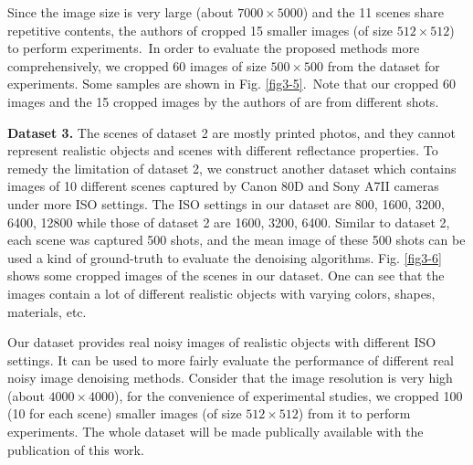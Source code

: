 Since the image size is very large (about $7000\times5000$) and the 11 scenes share repetitive contents, the authors of \cite{crosschannel2016} cropped 15 smaller images (of size $512\times512$) to perform experiments.\ In order to evaluate the proposed methods more comprehensively, we cropped 60 images of size $500\times500$ from the dataset for experiments. Some samples are shown in Fig. \ref{fig3-5}.\ Note that our cropped 60 images and the 15 cropped images by the authors of \cite{crosschannel2016} are from different shots.


\textbf{Dataset 3.} The scenes of dataset 2 are mostly printed photos, and they cannot represent realistic objects and scenes with different reflectance properties. To remedy the limitation of dataset 2, we construct another dataset which contains images of 10 different scenes captured by Canon 80D and Sony A7II cameras under more ISO settings. The ISO settings in our dataset are 800, 1600, 3200, 6400, 12800 while those of dataset 2 are 1600, 3200, 6400. Similar to dataset 2, each scene was captured 500 shots, and the mean image of these 500 shots can be used a kind of ground-truth to evaluate the denoising algorithms. Fig. \ref{fig3-6} shows some cropped images of the scenes in our dataset. One can see that the images contain a lot of different realistic objects with varying colors, shapes, materials, etc. 

Our dataset provides real noisy images of realistic objects with different ISO settings. It can be used to more fairly evaluate the performance of different real noisy image denoising methods. Consider that the image resolution is very high (about $4000\times4000$), for the convenience of experimental studies, we cropped 100 (10 for each scene) smaller images (of size $512\times512$) from it to perform experiments. The whole dataset will be made publically available with the publication of this work.


